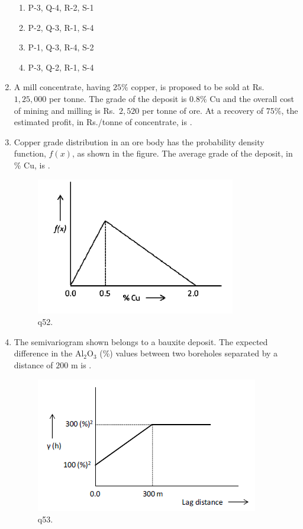 \documentclass[journal]{IEEEtran}
\begin{document}
\begin{enumerate}
\begin{enumerate}
\item P-3, Q-4, R-2, S-1
    \item P-2, Q-3, R-1, S-4
    \item P-1, Q-3, R-4, S-2
    \item P-3, Q-2, R-1, S-4
\end{enumerate}
\hfill{}
\newpage
\item A mill concentrate, having $25\%$ copper, is proposed to be sold at Rs.\ $1{,}25{,}000$ per tonne. 
The grade of the deposit is $0.8\%$ Cu and the overall cost of mining and milling is Rs.\ $2{,}520$ per tonne of ore. 
At a recovery of $75\%$, the estimated profit, in Rs./tonne of concentrate, is \underline{\hspace{2.2cm}}.
\hfill{}

\item Copper grade distribution in an ore body has the probability density function, $f(x)$, as shown in the figure.
The average grade of the deposit, in \% Cu, is \underline{\hspace{2cm}}.

\begin{figure}[h!]
    \centering
    \includegraphics[width=0.55\linewidth]{figs/q52.png}
    \caption{q52.}
    \label{fig:q52}
\end{figure}
\hfill{}
\item The semivariogram shown belongs to a bauxite deposit. The expected difference in the Al$_2$O$_3$ (\%) values
between two boreholes separated by a distance of $200$ m is \underline{\hspace{2cm}}.

\begin{figure}[h!]
    \centering
    \includegraphics[width=0.55\linewidth]{figs/q53.png}
    \caption{q53.}
    \label{fig:q53}
\end{figure}
\hfill{}


\end{enumerate}
\end{document}

